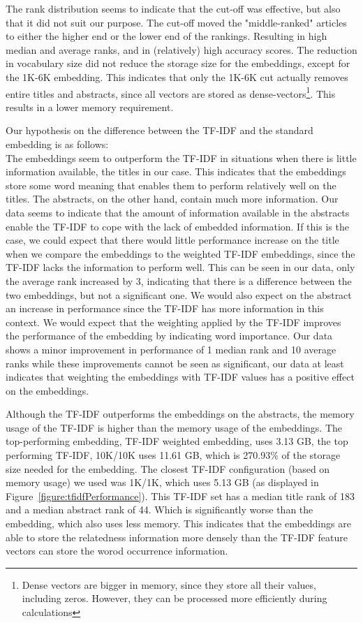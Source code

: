 \documentclass[../../Thesis.tex]{subfiles}
\begin{document}
The rank distribution seems to indicate that the cut-off was effective, but also that it did not suit our purpose. The cut-off moved the "middle-ranked"  articles to either the higher end or the lower end of the rankings. Resulting in high median and average ranks, and in (relatively) high accuracy scores. The reduction in vocabulary size did not reduce the storage size for the embeddings, except for the 1K-6K embedding. This indicates that only the 1K-6K cut actually removes entire titles and abstracts, since all vectors are stored as dense-vectors\footnote{Dense vectors are bigger in memory, since they store all their values, including zeros. However, they can be processed more efficiently during calculations}. This results in a lower memory requirement.

Our hypothesis on the difference between the TF-IDF and the standard embedding is as follows:\\
The embeddings seem to outperform the TF-IDF in situations when there is little information available, the titles in our case. This indicates that the embeddings store some word meaning that enables them to perform relatively well on the titles. The abstracts, on the other hand, contain much more information. Our data seems to indicate that the amount of information available in the abstracts enable the TF-IDF to cope with the lack of embedded information. 
If this is the case, we could expect that there would little performance increase on the title when we compare the embeddings to the weighted TF-IDF embeddings, since the TF-IDF lacks the information to perform well. This can be seen in our data, only the average rank increased by 3, indicating that there is a difference between the two embeddings, but not a significant one. We would also expect on the abstract an increase in performance since the TF-IDF has more information in this context. We would expect that the weighting applied by the TF-IDF improves the performance of the embedding by indicating word importance. Our data shows a minor improvement in performance of 1 median rank and 10 average ranks while these improvements cannot be seen as significant, our data at least indicates that weighting the embeddings with TF-IDF values has a positive effect on the embeddings.

Although the TF-IDF outperforms the embeddings on the abstracts, the memory usage of the TF-IDF is higher than the memory usage of the embeddings. The top-performing embedding, TF-IDF weighted embedding, uses 3.13 GB, the top performing TF-IDF, 10K/10K uses 11.61 GB, which is 270.93\% of the storage size needed for the embedding. The closest TF-IDF configuration (based on memory usage) we used was 1K/1K, which uses 5.13 GB (as displayed in Figure~\ref{figure:tfidfPerformance}). This TF-IDF set has a median title rank of 183 and a median abstract rank of 44. Which is significantly worse than the embedding, which also uses less memory. This indicates that the embeddings are able to store the relatedness information more densely than the TF-IDF feature vectors can store the worod occurrence information.
\end{document}
